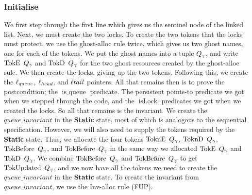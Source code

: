 \documentclass[twoside,11pt,openright]{report}
\newcommand{\isLock}{\operatorname{isLock}}
\newcommand{\isqueue}{\operatorname{is\_queue}}
\newcommand{\StaticState}{\textbf{Static}}
\newcommand{\Qgnames}{Q_\gname}
\newcommand{\TokE}[1]{\operatorname{TokE}\ #1}
\newcommand{\TokEQg}{\TokE{\Qgnames}}
\newcommand{\ToknE}[1]{\operatorname{ToknE}\ #1}
\newcommand{\ToknEQg}{\ToknE{\Qgnames}}
\newcommand{\TokD}[1]{\operatorname{TokD}\ #1}
\newcommand{\TokDQg}{\TokD{\Qgnames}}
\newcommand{\ToknD}[1]{\operatorname{ToknD}\ #1}
\newcommand{\ToknDQg}{\ToknD{\Qgnames}}
\newcommand{\TokBefore}[1]{\operatorname{TokBefore}\ #1}
\newcommand{\TokBeforeQg}{\TokBefore{\Qgnames}}
\newcommand{\TokAfterQg}{\TokBefore{\Qgnames}}
\newcommand{\TokUpdated}[1]{\operatorname{TokUpdated}\ #1}
\newcommand{\TokUpdatedQg}{\TokUpdated{\Qgnames}}
\begin{document}
\subsubsection{Initialise}
We first step through the first line which gives us the sentinel node of the linked list. Next, we must create the two locks. To create the two tokens that the locks must protect, we use the ghost-alloc rule twice, which gives us two ghost names, one for each of the tokens. We put the ghost names into a tuple $\Qgnames$, and write $\TokEQg$ and $\TokDQg$ for the two ghost resources created by the ghost-alloc rule. We then create the locks, giving up the two tokens. Following this, we create the $\ell_{queue}$, $\ell_{head}$, and $\ell{tail}$ pointers. All that remains then is to prove the postcondition; the $\isqueue$ predicate. The persistent points-to predicate we got when we stepped through the code, and the $\isLock$ predicates we got when we created the locks. So all that remains is the invariant. We create the $queue\_invariant$ in the \StaticState{} state, most of which is analogous to the sequential specification. However, we will also need to supply the tokens required by the \StaticState{} state. Thus, we allocate the four tokens $\ToknEQg$, $\ToknDQg$, $\TokBeforeQg$, and $\TokAfterQg$ in the same way we allocated $\TokEQg$ and $\TokDQg$. We combine $\TokBeforeQg$ and $\TokAfterQg$ to get $\TokUpdatedQg$, and we now have all the tokens we need to create the $queue\_invariant$ in the \StaticState{} state. To create the invariant from $queue\_invariant$, we use the Inv-alloc rule (FUP).
\end{document}
